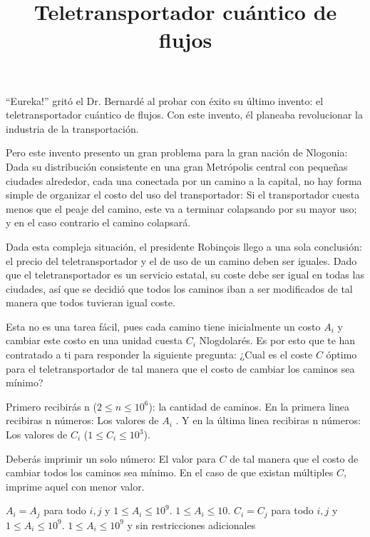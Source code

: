\documentclass{oci}
\title{Teletransportador cuántico de flujos}
\begin{document}
\begin{problemDescription}
``Eureka!'' gritó el Dr. Bernardé al probar con éxito su último invento: el
teletransportador cuántico de flujos.
Con este invento, él planeaba revolucionar la industria de la transportación.

Pero este invento presento un gran problema para la gran nación de Nlogonia:
Dada su distribución consistente en una gran Metrópolis central con pequeñas
ciudades alrededor, cada una conectada por un camino a la capital, no hay forma
simple de organizar el costo del uso del transportador: Si el transportador
cuesta menos que el peaje del camino, este va a terminar colapsando por su mayor
uso; y en el caso contrario el camino colapsará.

Dada esta compleja situación, el presidente Robinçois llego a una sola
conclusión: el precio del teletransportador y el de uso de un camino deben ser
iguales.
Dado que el teletransportador es un servicio estatal, su coste debe ser
igual en todas las ciudades, así que se decidió que todos los caminos iban a ser
modificados de tal manera que todos tuvieran igual coste.

Esta no es una tarea fácil, pues cada camino tiene inicialmente un costo $A_i$ y
cambiar este costo en una unidad cuesta $C_i$ Nlogdolarés.
Es por esto que te han contratado a ti para responder la siguiente pregunta:
¿Cual es el coste $C$ óptimo para el teletransportador de tal manera que el costo
de cambiar los caminos sea mínimo?

\end{problemDescription}

\begin{inputDescription}
  Primero recibirás n ($2 \leq n \leq 10^6$): la cantidad de caminos.
  En la primera
linea recibiras n números: Los valores de $A_i$ .
Y en la última linea recibiras n números: 
Los valores de $C_i$ ($1 \leq C_i \leq 10^3$).
\end{inputDescription}

\begin{outputDescription}
Deberás imprimir un solo número: El valor para $C$ de tal manera que el costo de
cambiar todos los caminos sea mínimo.
En el caso de que existan múltiples $C$, imprime aquel con menor valor.
\end{outputDescription}

\begin{scoreDescription}
   $A_i=A_j$ para todo $i,j$ y $1 \leq A_i \leq 10^9$.
   $1 \leq A_i \leq 10$.
   $C_i=C_j$ para todo $i,j$ y $1\leq A_i\leq 10^9$.
   $1\leq A_i\leq 10^9$ y sin restricciones adicionales
\end{scoreDescription}

\begin{sampleDescription}
\end{sampleDescription}
\end{document}
